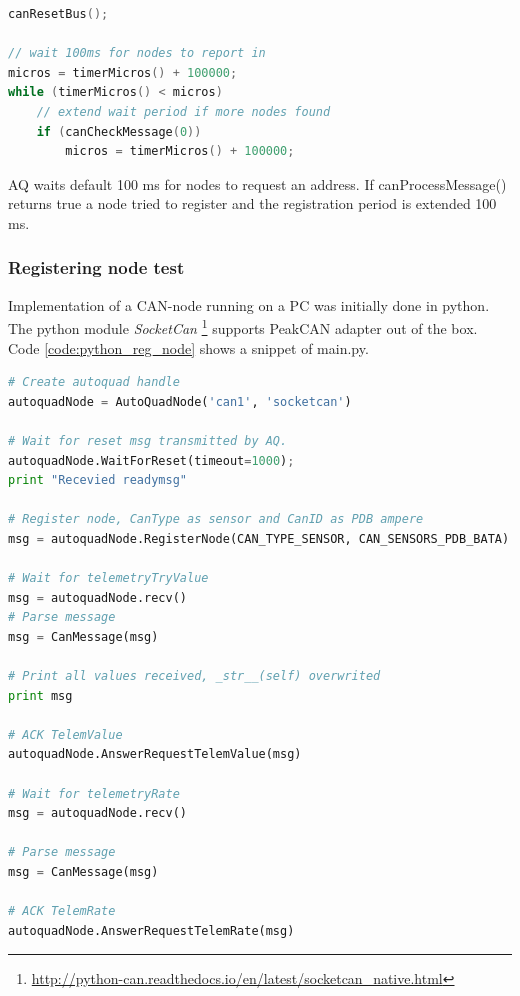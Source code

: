 \begin{lstlisting}[language = c, caption = Snippet showing AQ waits for devices, label=code:aq_req_extend_time]
canResetBus();

// wait 100ms for nodes to report in
micros = timerMicros() + 100000;
while (timerMicros() < micros)
    // extend wait period if more nodes found
    if (canCheckMessage(0))
        micros = timerMicros() + 100000;
\end{lstlisting}

AQ waits default 100 ms for nodes to request an address. If canProcessMessage() returns true a node tried to register and the registration period is extended 100 ms.
 
\subsubsection*{Registering node test} \label{sec:reg_node_test}
Implementation of a CAN-node running on a PC was initially done in python. The python module \textit{SocketCan} \footnote{\url{http://python-can.readthedocs.io/en/latest/socketcan_native.html}} supports PeakCAN adapter out of the box.\\

Code \ref{code:python_reg_node} shows a snippet of main.py.

\begin{lstlisting}[language = python, caption = Snippet showing AQ registration from python, label=code:python_reg_node]
# Create autoquad handle
autoquadNode = AutoQuadNode('can1', 'socketcan')

# Wait for reset msg transmitted by AQ.
autoquadNode.WaitForReset(timeout=1000);
print "Recevied readymsg"

# Register node, CanType as sensor and CanID as PDB ampere
msg = autoquadNode.RegisterNode(CAN_TYPE_SENSOR, CAN_SENSORS_PDB_BATA)

# Wait for telemetryTryValue
msg = autoquadNode.recv()
# Parse message
msg = CanMessage(msg)

# Print all values received, _str__(self) overwrited
print msg

# ACK TelemValue
autoquadNode.AnswerRequestTelemValue(msg)

# Wait for telemetryRate
msg = autoquadNode.recv()

# Parse message
msg = CanMessage(msg)

# ACK TelemRate
autoquadNode.AnswerRequestTelemRate(msg)
\end{lstlisting}

